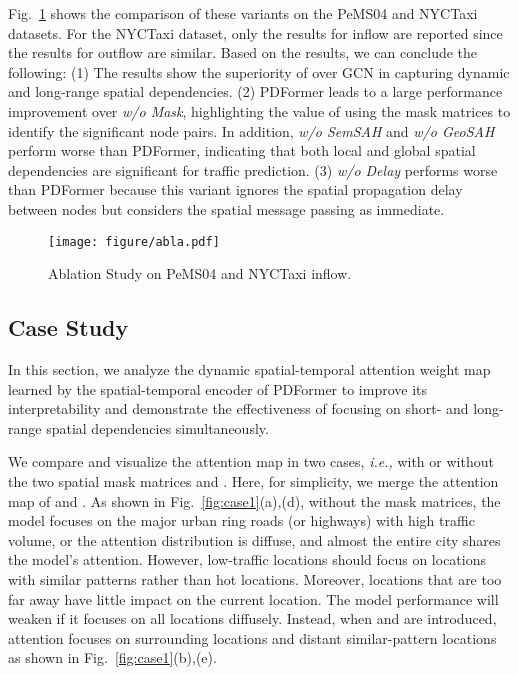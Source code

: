 \documentclass[letterpaper]{article} \usepackage{aaai23}  \usepackage{times}  \usepackage{helvet}  \usepackage{courier}  \usepackage[hyphens]{url}  \usepackage{graphicx} \urlstyle{rm} \def\UrlFont{\rm}  \usepackage{natbib}  \usepackage{caption} \frenchspacing  \setlength{\pdfpagewidth}{8.5in} \setlength{\pdfpageheight}{11in} \usepackage{algorithm}
\newcommand{\name}{PDFormer\xspace}
\newcommand{\ie}{\emph{i.e.,}\xspace}
\newcommand{\pfour}{PeMS04\xspace}
\newcommand{\taxi}{NYCTaxi\xspace}
\newcommand{\ssa}{\xspace}
\newcommand{\gsah}{\xspace}
\newcommand{\ssah}{\xspace}
\begin{document}
Fig.~\ref{fig:abla} shows the comparison of these variants on the \pfour and \taxi datasets. For the \taxi dataset, only the results for inflow are reported since the results for outflow are similar. Based on the results, we can conclude the following: (1) The results show the superiority of \ssa over GCN in capturing dynamic and long-range spatial dependencies. (2) \name leads to a large performance improvement over \textit{w/o Mask}, highlighting the value of using the mask matrices to identify the significant node pairs. In addition, \textit{w/o SemSAH} and \textit{w/o GeoSAH} perform worse than \name, indicating that both local and global spatial dependencies are significant for traffic prediction. (3) \textit{w/o Delay} performs worse than \name because this variant ignores the spatial propagation delay between nodes but considers the spatial message passing as immediate.

\begin{figure}[t]
    \centering
    \texttt{[image: figure/abla.pdf]}
    \caption{Ablation Study on \pfour and \taxi inflow.}
    \label{fig:abla}
\end{figure}







\subsection{Case Study}
In this section, we analyze the dynamic spatial-temporal attention weight map learned by the spatial-temporal encoder of \name to improve its interpretability and demonstrate the effectiveness of focusing on short- and long-range spatial dependencies simultaneously.

We compare and visualize the attention map in two cases, \ie with or without the two spatial mask matrices  and . Here, for simplicity, we merge the attention map of \gsah and \ssah. As shown in Fig.~\ref{fig:case1}(a),(d), without the mask matrices, the model focuses on the major urban ring roads (or highways) with high traffic volume, or the attention distribution is diffuse, and almost the entire city shares the model's attention. However, low-traffic locations should focus on locations with similar patterns rather than hot locations. Moreover, locations that are too far away have little impact on the current location. The model performance will weaken if it focuses on all locations diffusely. Instead, when  and  are introduced, attention focuses on surrounding locations and distant similar-pattern locations as shown in Fig.~\ref{fig:case1}(b),(e).
\end{document}
